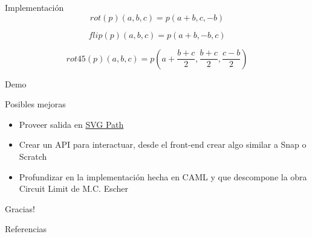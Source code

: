 \documentclass{beamer}
\begin{document}
    \begin{frame}{Implementación}
        \begin{equation*}
        rot(p)(a, b, c) = p(a + b, c, -b)
        \end{equation*}

        \begin{equation*}
        flip(p)(a, b, c) = p(a + b, -b, c)
        \end{equation*}

        \begin{equation*}
        rot45(p)(a, b, c) = p(a + \frac{b + c}{2}, \frac{b + c}{2}, \frac{c - b}{2})
        \end{equation*}
    \end{frame}

    \begin{frame}[standout]
        Demo
    \end{frame}

    \begin{frame}{Posibles mejoras}
    \begin{itemize}
    \item Proveer salida en \href{https://developer.mozilla.org/en/docs/Web/SVG/Tutorial/Paths}{SVG Path}
    \item Crear un API para interactuar, desde el front-end crear algo similar a Snap o Scratch
    \item Profundizar en la implementación hecha en CAML y que descompone la obra Circuit Limit de M.C. Escher
    \end{itemize}
    \end{frame}

    \begin{frame}[standout]
        Gracias!
    \end{frame}

    \begin{frame}[allowframebreaks]{Referencias}
        
        
    \end{frame}
\end{document}
